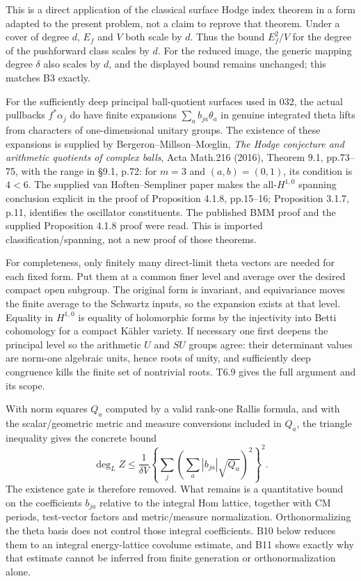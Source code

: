 \documentclass[11pt,a4paper]{article}
\theoremstyle{definition}
\begin{document}
This is a direct application of the classical surface Hodge index theorem in a form adapted to the present problem, not a claim to reprove that theorem. Under a cover of degree \(d\), \(E_f\) and \(V\) both scale by \(d\). Thus the bound \(E_f^2/V\) for the degree of the pushforward class scales by \(d\). For the reduced image, the generic mapping degree \(\delta\) also scales by \(d\), and the displayed bound remains unchanged; this matches B3 exactly.

For the sufficiently deep principal ball-quotient surfaces used in 032, the actual pullbacks \(f^*\alpha_j\) do have finite expansions \(\sum_a b_{ja}\theta_a\) in genuine integrated theta lifts from characters of one-dimensional unitary groups. The existence of these expansions is supplied by Bergeron--Millson--Mœglin, \emph{The Hodge conjecture and arithmetic quotients of complex balls}, Acta Math.216 (2016), Theorem 9.1, pp.73--75, with the range in §9.1, p.72: for \(m=3\) and \((a,b)=(0,1)\), its condition is \(4<6\). The supplied van Hoften--Sempliner paper makes the all-\(H^{1,0}\) spanning conclusion explicit in the proof of Proposition 4.1.8, pp.15--16; Proposition 3.1.7, p.11, identifies the oscillator constituents. The published BMM proof and the supplied Proposition 4.1.8 proof were read. This is imported classification/spanning, not a new proof of those theorems.

For completeness, only finitely many direct-limit theta vectors are needed for each fixed form. Put them at a common finer level and average over the desired compact open subgroup. The original form is invariant, and equivariance moves the finite average to the Schwartz inputs, so the expansion exists at that level. Equality in \(H^{1,0}\) is equality of holomorphic forms by the injectivity into Betti cohomology for a compact Kähler variety. If necessary one first deepens the principal level so the arithmetic \(U\) and \(SU\) groups agree: their determinant values are norm-one algebraic units, hence roots of unity, and sufficiently deep congruence kills the finite set of nontrivial roots. T6.9 gives the full argument and its scope.

With norm squares \(Q_a\) computed by a valid rank-one Rallis formula, and with the scalar/geometric metric and measure conversions included in \(Q_a\), the triangle inequality gives the concrete bound \[
 \deg_L Z\leq\frac{1}{\delta V}
 \left\{\sum_j\left(\sum_a|b_{ja}|\sqrt{Q_a}\right)^2\right\}^2.
\] The existence gate is therefore removed. What remains is a quantitative bound on the coefficients \(b_{ja}\) relative to the integral Hom lattice, together with CM periods, test-vector factors and metric/measure normalization. Orthonormalizing the theta basis does not control those integral coefficients. B10 below reduces them to an integral energy-lattice covolume estimate, and B11 shows exactly why that estimate cannot be inferred from finite generation or orthonormalization alone.
\end{document}
